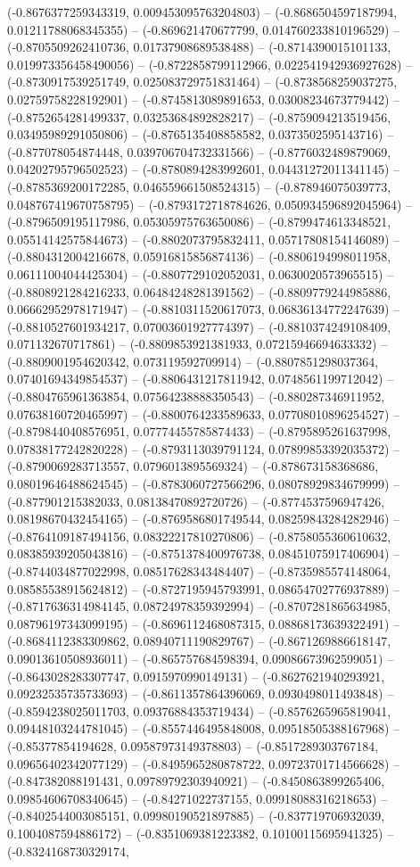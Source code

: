 (-0.8676377259343319, 0.009453095763204803) -- (-0.8686504597187994, 0.01211788068345355) -- (-0.869621470677799, 0.014760233810196529) -- (-0.8705509262410736, 0.01737908689538488) -- (-0.8714390015101133, 0.019973356458490056) -- (-0.8722858799112966, 0.022541942936927628) -- (-0.8730917539251749, 0.025083729751831464) -- (-0.8738568259037275, 0.02759758228192901) -- (-0.8745813089891653, 0.03008234673779442) -- (-0.8752654281499337, 0.03253684892828217) -- (-0.8759094213519456, 0.03495989291050806) -- (-0.8765135408858582, 0.0373502595143716) -- (-0.877078054874448, 0.039706704732331566) -- (-0.8776032489879069, 0.04202795796502523) -- (-0.8780894283992601, 0.04431272011341145) -- (-0.8785369200172285, 0.046559661508524315) -- (-0.878946075039773, 0.048767419670758795) -- (-0.8793172718784626, 0.050934596892045964) -- (-0.8796509195117986, 0.05305975763650086) -- (-0.8799474613348521, 0.05514142575844673) -- (-0.8802073795832411, 0.05717808154146089) -- (-0.8804312004216678, 0.05916815856874136) -- (-0.8806194998011958, 0.06111004044425304) -- (-0.8807729102052031, 0.0630020573965515) -- (-0.8808921284216233, 0.06484248281391562) -- (-0.8809779244985886, 0.06662952978171947) -- (-0.8810311520617073, 0.06836134772247639) -- (-0.8810527601934217, 0.07003601927774397) -- (-0.8810374249108409, 0.071132670717861) -- (-0.8809853921381933, 0.07215946694633332) -- (-0.8809001954620342, 0.073119592709914) -- (-0.8807851298037364, 0.07401694349854537) -- (-0.8806431217811942, 0.0748561199712042) -- (-0.8804765961363854, 0.07564238888350543) -- (-0.880287346911952, 0.07638160720465997) -- (-0.8800764233589633, 0.07708010896254527) -- (-0.8798440408576951, 0.07774455785874433) -- (-0.8795895261637998, 0.07838177242820228) -- (-0.8793113039791124, 0.07899853392035372) -- (-0.8790069283713557, 0.0796013895569324) -- (-0.878673158368686, 0.08019646488624545) -- (-0.8783060727566296, 0.08078929834679999) -- (-0.877901215382033, 0.08138470892720726) -- (-0.8774537596947426, 0.08198670432454165) -- (-0.8769586801749544, 0.08259843284282946) -- (-0.8764109187494156, 0.08322217810270806) -- (-0.8758055360610632, 0.08385939205043816) -- (-0.8751378400976738, 0.08451075917406904) -- (-0.8744034877022998, 0.08517628343484407) -- (-0.8735985574148064, 0.08585538915624812) -- (-0.8727195945793991, 0.08654702776937889) -- (-0.8717636314984145, 0.08724978359392994) -- (-0.8707281865634985, 0.08796197343099195) -- (-0.8696112468087315, 0.08868173639322491) -- (-0.8684112383309862, 0.08940711190829767) -- (-0.8671269886618147, 0.09013610508936011) -- (-0.865757684598394, 0.09086673962599051) -- (-0.8643028283307747, 0.0915970990149131) -- (-0.8627621940293921, 0.09232535735733693) -- (-0.8611357864396069, 0.0930498011493848) -- (-0.8594238025011703, 0.09376884353719434) -- (-0.8576265965819041, 0.09448103244781045) -- (-0.8557446495848008, 0.09518505388167968) -- (-0.85377854194628, 0.09587973149378803) -- (-0.8517289303767184, 0.09656402342077129) -- (-0.8495965280878722, 0.09723701714566628) -- (-0.847382088191431, 0.09789792303940921) -- (-0.8450863899265406, 0.09854606708340645) -- (-0.84271022737155, 0.09918088316218653) -- (-0.8402544003085151, 0.09980190521897885) -- (-0.837719706932039, 0.1004087594886172) -- (-0.8351069381223382, 0.10100115695941325) -- (-0.8324168730329174, 